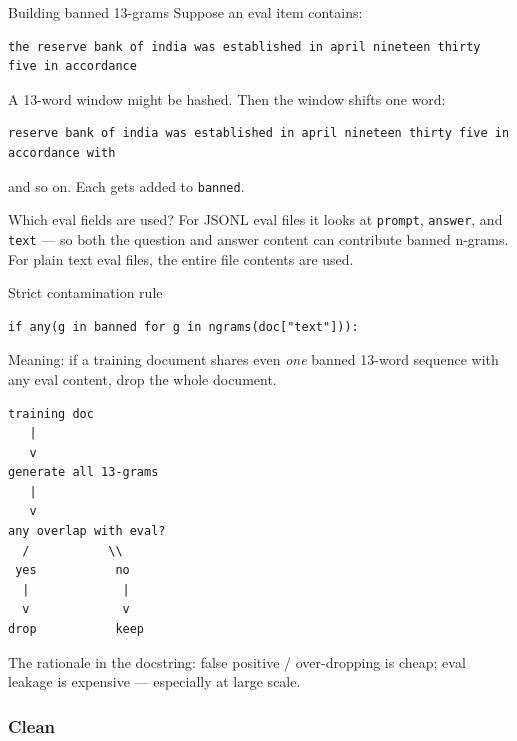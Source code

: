 \begin{paragraphblock}{Building banned 13-grams}
  Suppose an eval item contains:
\begin{lstlisting}[style=shadedpython,language={},basicstyle=\scriptsize\ttfamily]
the reserve bank of india was established in april nineteen thirty five in accordance
\end{lstlisting}
  A 13-word window might be hashed. Then the window shifts one word:
\begin{lstlisting}[style=shadedpython,language={},basicstyle=\scriptsize\ttfamily]
reserve bank of india was established in april nineteen thirty five in accordance with
\end{lstlisting}
  and so on. Each gets added to \texttt{banned}.
\end{paragraphblock}

\begin{paragraphblock}{Which eval fields are used?}
  For JSONL eval files it looks at \texttt{prompt}, \texttt{answer}, and
  \texttt{text} --- so both the question and answer content can contribute
  banned n-grams. For plain text eval files, the entire file contents are
  used.
\end{paragraphblock}

\begin{paragraphblock}{Strict contamination rule}

\begin{lstlisting}[style=shadedpython]
if any(g in banned for g in ngrams(doc["text"])):
\end{lstlisting}
  Meaning: if a training document shares even \emph{one} banned 13-word
  sequence with any eval content, drop the whole document.
\begin{lstlisting}[style=shadedpython,language={},basicstyle=\scriptsize\ttfamily]
training doc
   |
   v
generate all 13-grams
   |
   v
any overlap with eval?
  /           \\
 yes           no
  |             |
  v             v
drop           keep
\end{lstlisting}
  The rationale in the docstring: false positive / over-dropping is cheap;
  eval leakage is expensive --- especially at large scale.
\end{paragraphblock}

\subsubsection{Clean}

